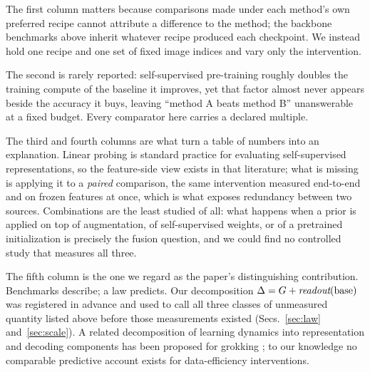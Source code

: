 The first column matters because comparisons made under each method's own
preferred recipe cannot attribute a difference to the method; the backbone
benchmarks above inherit whatever recipe produced each checkpoint. We instead
hold one recipe and one set of fixed image indices and vary only the
intervention.

The second is rarely reported: self-supervised pre-training roughly doubles
the training compute of the baseline it improves, yet that factor almost never
appears beside the accuracy it buys, leaving ``method A beats method B''
unanswerable at a fixed budget. Every comparator here carries a declared
multiple.

The third and fourth columns are what turn a table of numbers into an
explanation. Linear probing is standard practice for evaluating self-supervised
representations, so the feature-side view exists in that literature; what is
missing is applying it to a \emph{paired} comparison, the same intervention
measured end-to-end and on frozen features at once, which is what exposes
redundancy between two sources. Combinations are the least studied of all:
what happens when a prior is applied on top of augmentation, of
self-supervised weights, or of a pretrained initialization is
precisely the fusion question, and we could find no controlled study that
measures all three.

The fifth column is the one we regard as the paper's distinguishing
contribution. Benchmarks describe; a law predicts. Our decomposition $\Delta =
G + \textit{readout}(\mathrm{base})$ was registered in advance and used to call
all three classes of unmeasured quantity listed above before those measurements
existed (Secs.~\ref{sec:law} and~\ref{sec:scale}). A related decomposition
of learning dynamics into representation and decoding components has been
proposed for grokking \citep{liu2022grokking}; to our knowledge no comparable
predictive account exists for data-efficiency interventions.
